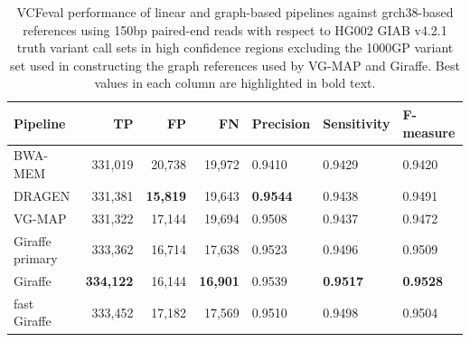 \documentclass[11pt]{ucscthesis}
\begin{document}
\begin{table}[H]
    \centering
    \begin{tabular}{|l|r|r|r|l|l|l|}
     \hline
    Pipeline                    & TP                 & FP              & FN              & Precision       & Sensitivity     & F-measure       \\
     \hline
    BWA-MEM                     & 331,019            & 20,738          & 19,972          & 0.9410          & 0.9429          & 0.9420         \\
    DRAGEN                      & 331,381            & \textbf{15,819} & 19,643          & \textbf{0.9544} & 0.9438          & 0.9491          \\
    VG-MAP                      & 331,322            & 17,144          & 19,694          & 0.9508          & 0.9437          & 0.9472          \\
    Giraffe primary             & 333,362            & 16,714          & 17,638          & 0.9523          & 0.9496          & 0.9509         \\
    Giraffe                     & \textbf{334,122}   & 16,144          & \textbf{16,901} & 0.9539          & \textbf{0.9517} & \textbf{0.9528}\\
    fast Giraffe                & 333,452            & 17,182          & 17,569          & 0.9510          & 0.9498          & 0.9504         \\
    \hline
    \end{tabular}
\caption[Genotyping evaluation with VCFeval in HG002 using 150bp paired-end reads against the grch38-based graph reference in regions excluding the 1000GP variant set]{VCFeval performance of linear and graph-based pipelines against grch38-based references using 150bp paired-end reads with respect to HG002 GIAB v4.2.1 truth variant call sets in high confidence regions excluding the 1000GP variant set used in constructing the graph references used by VG-MAP and Giraffe. Best values in each column are highlighted in bold text.}
\label{tab:vcfeval_high_conf_1000GP_excluded_2x150_hg002_grch38}
\end{table}
\end{document}
